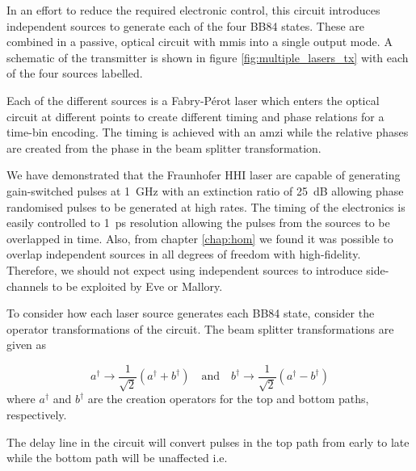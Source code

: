 In an effort to reduce the required electronic control, this circuit introduces independent sources to generate each of the four BB84 states. These are combined in a passive, optical circuit with \acp{mmi} into a single output mode. A schematic of the transmitter is shown in figure \ref{fig:multiple_lasers_tx} with each of the four sources labelled. 

Each of the different sources is a Fabry-P\'{e}rot laser which enters the optical circuit at different points to create different timing and phase relations for a time-bin encoding. The timing is achieved with an \ac{amzi} while the relative phases are created from the phase in the beam splitter transformation. 

We have demonstrated that the Fraunhofer HHI laser are capable of generating gain-switched pulses at \SI{1}{GHz} with an extinction ratio of \SI{25}{dB} allowing phase randomised pulses to be generated at high rates. The timing of the electronics is easily controlled to \SI{1}{ps} resolution allowing the pulses from the sources to be overlapped in time. Also, from chapter \ref{chap:hom} we found it was possible to overlap independent sources in all degrees of freedom with high-fidelity. Therefore, we should not expect using independent sources to introduce side-channels to be exploited by Eve or Mallory.



To consider how each laser source generates each BB84 state, consider the operator transformations of the circuit. The beam splitter transformations are given as 

\begin{equation}
	a^\dagger \rightarrow \frac{1}{\sqrt{2}}\left(a^\dagger + b^\dagger\right) \quad \text{and} \quad b^\dagger \rightarrow \frac{1}{\sqrt{2}}\left(a^\dagger - b^\dagger\right)
\end{equation}
where $a^\dagger$ and $b^\dagger$ are the creation operators for the top and bottom paths, respectively.

The delay line in the circuit will convert pulses in the top path from early to late while the bottom path will be unaffected i.e.


